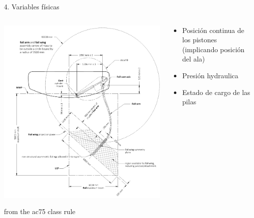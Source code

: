 \documentclass[presentation,aspectratio=169]{beamer}
\begin{document}
\begin{frame}[label={sec:orgdb6c4df}]{4. Variables físicas}
\begin{columns}
\begin{column}{0.5\columnwidth}
\begin{center}
\includegraphics[height=0.8\textheight]{../../figures/ac75-class-foil.png}
\end{center}

{\footnotesize from the ac75 class rule}
\end{column}
\begin{column}{0.5\columnwidth}
\begin{itemize}
\item Posición continua de los pistones (implicando posición del ala)
\item Presión hydraulica
\item Estado de cargo de las pilas
\end{itemize}
\end{column}
\end{columns}
\end{frame}
\end{document}
